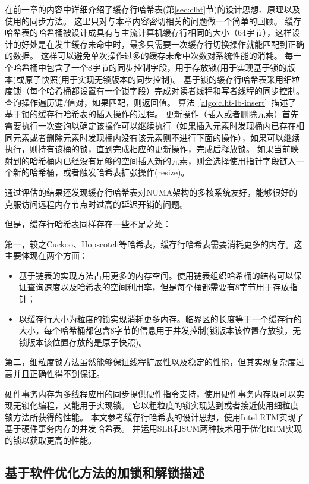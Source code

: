 在前一章的内容中详细介绍了缓存行哈希表(第\ref{sec:clht}节)的设计思想、原理以及使用的同步方法。
这里只对与本章内容密切相关的问题做一个简单的回顾。
缓存哈希表的哈希桶被设计成具有与主流计算机缓存行相同的大小（64字节），这样设计的好处是在发生缓存未命中时，最多只需要一次缓存行切换操作就能匹配到正确的数据。
这样可以避免单次操作过多的缓存未命中次数对系统性能的消耗。
每一个哈希桶中包含了一个8字节的同步控制字段，用于存放锁(用于实现基于锁的版本)或原子快照(用于实现无锁版本的同步控制)。
基于锁的缓存行哈希表采用细粒度锁（每个哈希桶都设置有一个锁字段）完成对读者线程和写者线程的同步控制。
查询操作遍历键/值对，如果匹配，则返回值。
算法~\ref{algo:clht-lb-insert}~描述了基于锁的缓存行哈希表的插入操作的过程。
更新操作（插入或者删除元素）首先需要执行一次查询以确定该操作可以继续执行（如果插入元素时发现桶内已存在相同元素或者删除元素时发现桶内没有该元素则不进行下面的操作），如果可以继续执行，则持有该桶的锁，直到完成相应的更新操作，完成后释放锁。
如果当前映射到的哈希桶内已经没有足够的空间插入新的元素，则会选择使用指针字段链入一个新的哈希桶，或者触发哈希表扩张操作(resize)。

通过评估的结果还发现缓存行哈希表对NUMA架构的多核系统友好，能够很好的克服访问远程内存节点时过高的延迟开销的问题。

但是，缓存行哈希表同样存在一些不足之处：

第一，较之Cuckoo、Hopscotch等哈希表，缓存行哈希表需要消耗更多的内存。这主要体现在两个方面：
\begin{itemize}
\item 基于链表的实现方法占用更多的内存空间。使用链表组织哈希桶的结构可以保证查询速度以及哈希表的空间利用率，但是每个桶都需要有8字节用于存放指针；
\item 以缓存行大小为粒度的锁实现消耗更多内存。临界区的长度等于一个缓存行的大小，每个哈希桶都包含8字节的信息用于并发控制(锁版本该位置存放锁，无锁版本该位置存放的是原子快照)。
\end{itemize}

第二，细粒度锁方法虽然能够保证线程扩展性以及稳定的性能，但其实现复杂度过高并且正确性得不到保证。

硬件事务内存为多线程应用的同步提供硬件指令支持，使用硬件事务内存既可以实现无锁化编程，又能用于实现锁。
它以粗粒度的锁实现达到或者接近使用细粒度锁方法所获得的性能。
本文参考缓存行哈希表的设计思想，使用Intel RTM实现了基于硬件事务内存的并发哈希表。
并运用SLR和SCM两种技术用于优化RTM实现的锁以获取更高的性能。

\subsection{基于软件优化方法的加锁和解锁描述}

